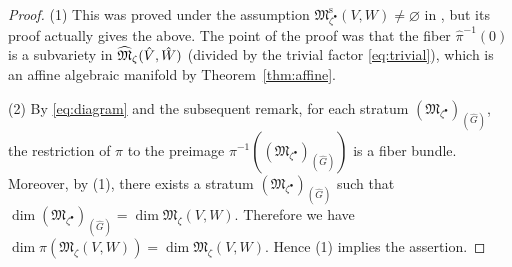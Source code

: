 \documentclass[10pt,a4paper]{amsart}
\theoremstyle{definition}
\numberwithin{equation}{section}
\newcommand{\thmref}[1]{Theorem~\ref{#1}}
\newcommand{\M}{{\mathfrak M}} %
\newcommand{\Mreg}{\M^{\operatorname{s}}}
\begin{document}
\begin{proof}
  (1) This was proved under the assumption
  $\Mreg_{\zeta^\bullet}(V,W)\neq\varnothing$ in \cite[6.11]{Na-quiver},
  but its proof actually gives the above. The point of the proof was
  that the f\/iber $\widehat\pi^{-1}(0)$ is a subvariety in
  $\widehat\M_\zeta(\Hat{V},\Hat{W})$ (divided by the trivial factor
  \eqref{eq:trivial}), which is an af\/f\/ine algebraic manifold by
  \thmref{thm:affine}.

(2) By \eqref{eq:diagram} and the subsequent remark, for each stratum
$(\M_{\zeta^\bullet})_{(\widehat G)}$, the restriction of $\pi$ to the
preimage $\pi^{-1}((\M_{\zeta^\bullet})_{(\widehat G)})$ is a f\/iber bundle.
Moreover, by (1), there exists a stratum $(\M_{\zeta^\bullet})_{(\widehat
  G)}$ such that $\dim (\M_{\zeta^\bullet})_{(\widehat G)} = \dim
\M_\zeta(V,W)$. Therefore we have $\dim \pi(\M_\zeta(V,W)) = \dim
\M_\zeta(V,W)$. Hence (1) implies the assertion.
\end{proof}
\end{document}
